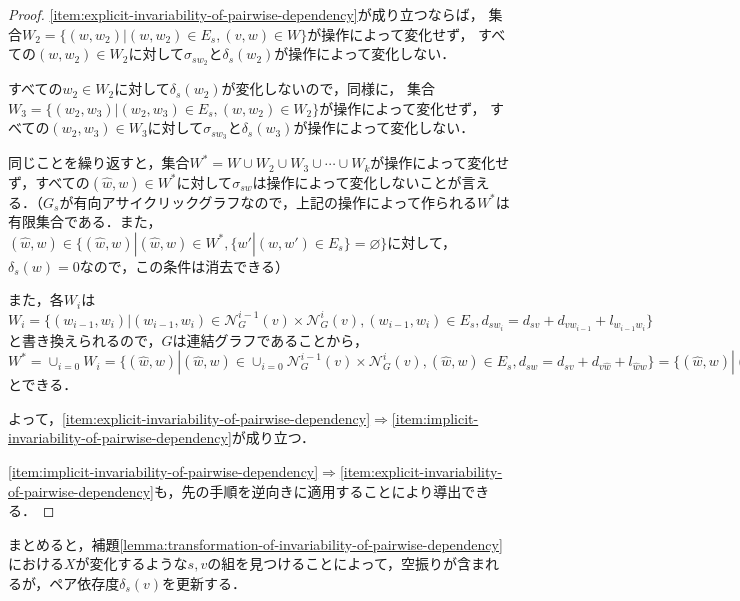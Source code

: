 \begin{proof}
  \ref{item:explicit-invariability-of-pairwise-dependency}が成り立つならば，
  集合$W_2=\{(w,w_2)|(w,w_2)\in E_s,(v,w)\in W\}$が操作によって変化せず，
  すべての$(w,w_2)\in W_2$に対して$\sigma_{sw_2}$と$\delta_s(w_2)$が操作によって変化しない．

  すべての$w_2\in W_2$に対して$\delta_s(w_2)$が変化しないので，同様に，
  集合$W_3=\{(w_2,w_3)|(w_2,w_3)\in E_s,(w,w_2)\in W_2\}$が操作によって変化せず，
  すべての$(w_2,w_3)\in W_3$に対して$\sigma_{sw_3}$と$\delta_s(w_3)$が操作によって変化しない．

  同じことを繰り返すと，集合$W^*=W\cup W_2\cup W_3\cup\cdots\cup W_k$が操作によって変化せず，すべての$(\hat{w},w)\in W^*$に対して$\sigma_{sw}$は操作によって変化しないことが言える．（$G_s$が有向アサイクリックグラフなので，上記の操作によって作られる$W^*$は有限集合である．また，$(\hat{w},w)\in\{(\hat{w},w)|(\hat{w},w)\in W^*,\{w'|(w,w')\in E_s\}=\varnothing\}$に対して，$\delta_s(w)=0$なので，この条件は消去できる）

  
  また，各$W_i$は$W_i=\{(w_{i-1},w_i)|(w_{i-1},w_i)\in\mathcal{N}^{i-1}_G(v)\times\mathcal{N}^i_G(v),(w_{i-1},w_i)\in E_s,d_{sw_i}=d_{sv}+d_{vw_{i-1}}+l_{w_{i-1}w_i}\}$と書き換えられるので，$G$は連結グラフであることから，$W^*=\cup_{i=0}W_i=\{(\hat{w},w)|(\hat{w},w)\in\cup_{i=0}\mathcal{N}^{i-1}_G(v)\times\mathcal{N}^i_G(v),(\hat{w},w)\in E_s,d_{sw}=d_{sv}+d_{v\hat{w}}+l_{\hat{w}w}\}=\{(\hat{w},w)|(\hat{w},w)\in E_s,d_{sw}=d_{sv}+d_{v\hat{w}}+l_{\hat{w}w}\}$とできる．

  よって，\ref{item:explicit-invariability-of-pairwise-dependency}$\Rightarrow$\ref{item:implicit-invariability-of-pairwise-dependency}が成り立つ．

  \ref{item:implicit-invariability-of-pairwise-dependency}$\Rightarrow$\ref{item:explicit-invariability-of-pairwise-dependency}も，先の手順を逆向きに適用することにより導出できる．
\end{proof}

まとめると，補題\ref{lemma:transformation-of-invariability-of-pairwise-dependency}における$X$が変化するような$s,v$の組を見つけることによって，空振りが含まれるが，ペア依存度$\delta_s(v)$を更新する．
